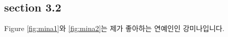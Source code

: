 \documentclass{article}
\begin{document}
\begin{figure}
    \begin{center}
    \end{center}
\end{figure}
\subsection{section 3.2}
    Figure \ref{fig:mina1}와 \ref{fig:mina2}는 제가 좋아하는 연예인인 강미나입니다.
\end{document}
